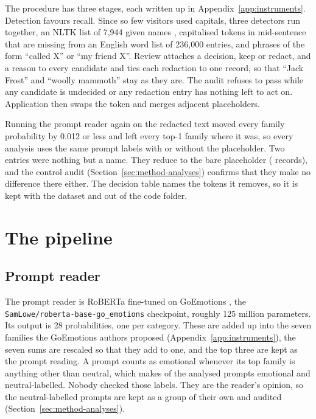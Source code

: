 The procedure has three stages, each written up in Appendix~\ref{app:instruments}. Detection favours recall. Since so few visitors used capitals, three detectors run together, an NLTK list of 7,944 given names \cite{bird2009natural}, capitalised tokens in mid-sentence that are missing from an English word list of 236,000 entries, and phrases of the form ``called X'' or ``my friend X''. Review attaches a decision, keep or redact, and a reason to every candidate and ties each redaction to one record, so that ``Jack Frost'' and ``woolly mammoth'' stay as they are. The audit refuses to pass while any candidate is undecided or any redaction entry has nothing left to act on. Application then swaps the token and merges adjacent placeholders.

Running the prompt reader again on the redacted text moved every family probability by 0.012 or less and left every top-1 family where it was, so every analysis uses the same prompt labels with or without the placeholder. Two entries were nothing but a name. They reduce to the bare placeholder (\CtrlNameOnly{} records), and the control audit (Section~\ref{sec:method-analyses}) confirms that they make no difference there either. The decision table names the tokens it removes, so it is kept with the dataset and out of the code folder.

\section{The pipeline}
\label{sec:method-pipeline}

\subsection{Prompt reader}

The prompt reader is RoBERTa fine-tuned on GoEmotions \cite{demszky2020goemotions}, the \texttt{SamLowe/\allowbreak roberta-base-go\_emotions} checkpoint, roughly 125 million parameters. Its output is 28 probabilities, one per category. These are added up into the seven families the GoEmotions authors proposed (Appendix~\ref{app:instruments}), the seven sums are rescaled so that they add to one, and the top three are kept as the prompt reading. A prompt counts as emotional whenever its top family is anything other than neutral, which makes \nEmotional{} of the \nAnalysed{} analysed prompts emotional and \nNonEmotional{} neutral-labelled. Nobody checked those labels. They are the reader's opinion, so the neutral-labelled prompts are kept as a group of their own and audited (Section~\ref{sec:method-analyses}).

